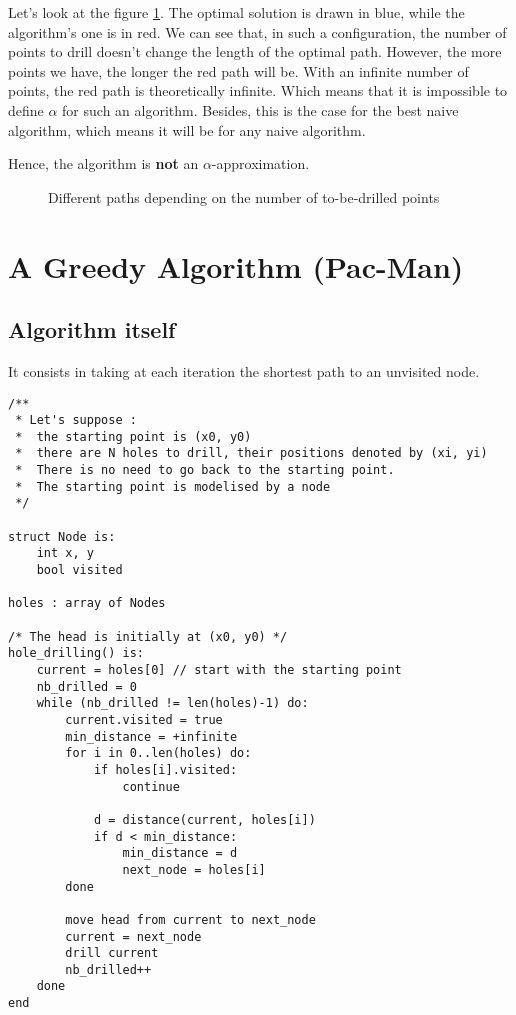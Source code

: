 \documentclass[11pt]{article}
\begin{document}
Let's look at the figure \ref{fig:counter-example}. The optimal solution is drawn in \textcolor{myblue}{blue}, while the algorithm's one
is in \textcolor{myred}{red}. We can see that, in such a configuration, the number of points to drill doesn't change the length of the
optimal path. However, the more points we have, the longer the red path will be. With an infinite number of points, the red path
is theoretically infinite. Which means that it is impossible to define $\alpha$ for such an algorithm. Besides, this is the case for the best
naive algorithm, which means it will be for any naive algorithm.

Hence, the algorithm is \textbf{not} an $\alpha$-approximation.


\begin{figure}[hb]
        \centering
        \begin{subfigure}[b]{0.2\textwidth}
        \end{subfigure}
		\hfill
        \begin{subfigure}[b]{0.2\textwidth}
        \end{subfigure}
		\hfill
        \begin{subfigure}[b]{0.2\textwidth}
        \end{subfigure}
        \caption{Different paths depending on the number of to-be-drilled points}
		\label{fig:counter-example}
\end{figure}


\section{A Greedy Algorithm (Pac-Man)}
\subsection{Algorithm itself}
It consists in taking at each iteration the shortest path to an unvisited node.

\begin{minipage}{\linewidth}
\begin{lstlisting}
/**
 * Let's suppose :
 *	the starting point is (x0, y0)
 *	there are N holes to drill, their positions denoted by (xi, yi) 
 *	There is no need to go back to the starting point.
 *	The starting point is modelised by a node
 */

struct Node is:
	int x, y
	bool visited

holes : array of Nodes

/* The head is initially at (x0, y0) */
hole_drilling() is:
	current = holes[0] // start with the starting point
	nb_drilled = 0
	while (nb_drilled != len(holes)-1) do:
		current.visited = true
		min_distance = +infinite
		for i in 0..len(holes) do:
			if holes[i].visited:
				continue

			d = distance(current, holes[i])
			if d < min_distance:
				min_distance = d
				next_node = holes[i]
		done

		move head from current to next_node
		current = next_node
		drill current
		nb_drilled++
	done
end
\end{lstlisting}
\end{minipage}
\end{document}
